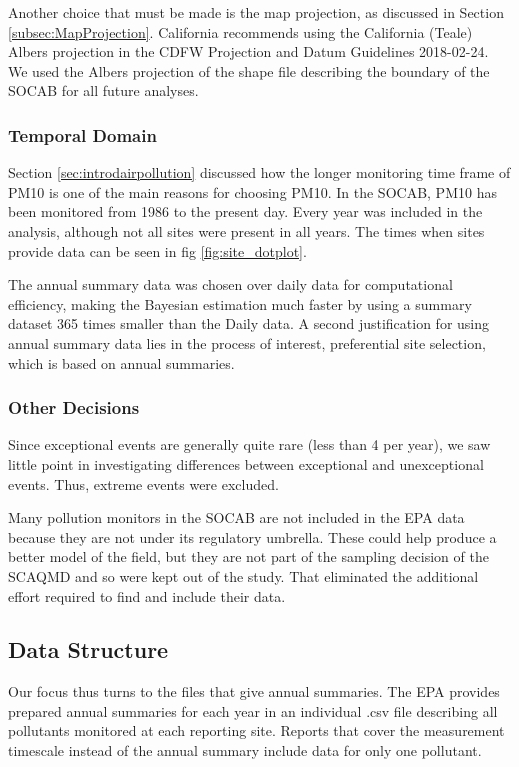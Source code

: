 Another choice that must be made is the map projection, as discussed in Section \ref{subsec:MapProjection}.  California recommends using the California (Teale) Albers projection in the CDFW Projection and Datum Guidelines 2018-02-24.  We used the Albers projection of the shape file describing the boundary of the \ac{SOCAB} for all future analyses.


\subsubsection*{Temporal Domain}
\label{subsubsec:tempdomain}
Section \ref{sec:introdairpollution} discussed how the longer monitoring time frame of \ac{PM10} is one of the main reasons for choosing \ac{PM10}.  In the \ac{SOCAB}, \ac{PM10} has been monitored from 1986 to the present day.  Every year was included in the analysis, although not all sites were present in all years.   The times when sites provide data can be seen in fig \ref{fig:site_dotplot}.

The annual summary data was chosen over daily data for
computational efficiency, making the Bayesian estimation much faster by using a summary dataset 365 times smaller than the Daily data.  A second justification for using annual summary data lies in the process of interest, preferential site selection, which is based on annual summaries.

\subsubsection*{Other Decisions}
\label{subsubsec:otherdecisions}
Since exceptional events are generally quite rare (less than 4 per year), we saw little point in investigating differences between exceptional and unexceptional events. Thus, extreme events were excluded.

Many pollution monitors in the \ac{SOCAB} are not included in the \ac{EPA} data because they are not under its regulatory umbrella.  These could help 
produce a better model of the field, but they are not part of the sampling decision of the \ac{SCAQMD} and so were kept out of the study. That eliminated the additional effort required to find and include their data.

\subsection{Data Structure}
\label{subsec:datastructure}
Our focus thus turns to the files that give annual summaries.
The \ac{EPA} provides prepared annual summaries for each year in an individual .csv file describing all pollutants monitored at each reporting site.  Reports that cover the measurement timescale instead of the annual summary include data for only one pollutant.  

